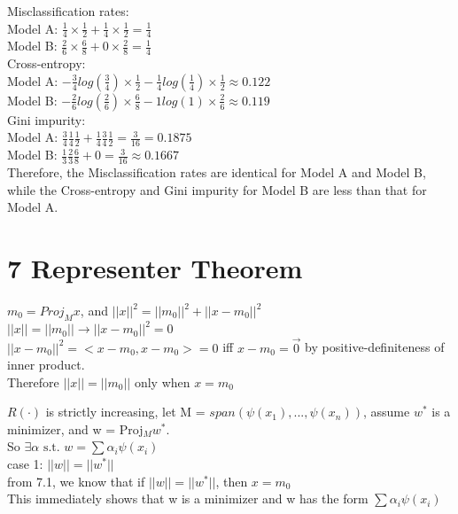 \documentclass{article}
\newenvironment{sub}[2][$-$]{\begin{trivlist}
		\item[\hskip \labelsep {\bfseries #1}\hskip \labelsep {\bfseries #2.}]}  {\end{trivlist}}
\begin{document}
Misclassification rates:\\
Model A: $\frac{1}{4} \times \frac{1}{2} +\frac{1}{4} \times \frac{1}{2} = \frac{1}{4}$\\
Model B: $\frac{2}{6} \times \frac{6}{8} +0 \times \frac{2}{8} = \frac{1}{4}$\\

Cross-entropy: \\
Model A: $-\frac{3}{4}log(\frac{3}{4})\times \frac{1}{2} - \frac{1}{4}log(\frac{1}{4})\times \frac{1}{2} \approx 0.122 $\\
Model B: $-\frac{2}{6}log(\frac{2}{6})\times \frac{6}{8} - 1log(1)\times \frac{2}{6}\approx 0.119 $\\

Gini impurity:\\
Model A: $\frac{3}{4}\frac{1}{4}\frac{1}{2} + \frac{1}{4}\frac{3}{4}\frac{1}{2} =  \frac{3}{16} = 0.1875$\\
Model B: $\frac{1}{3}\frac{2}{3}\frac{6}{8} + 0 =  \frac{3}{16} \approx 0.1667$\\

Therefore, the Misclassification rates are identical for Model A and Model B, while the Cross-entropy and Gini impurity for Model B are less than that for Model A.

\section{7 Representer Theorem}
\begin{sub}{7.1}
\end{sub}
$m_0 = Proj_Mx$, and $||x||^2 = ||m_0||^2 + ||x - m_0||^2$\\
$||x|| = ||m_0|| \rightarrow ||x - m_0||^2 = 0$\\
$||x - m_0||^2 = <x - m_0,x - m_0>= 0$ iff $x-m_0 =\vec{0}$ by positive-definiteness of inner product. \\
Therefore $||x|| = ||m_0||$ only when $x=m_0 $

\begin{sub}{7.2}
\end{sub}
$R(\cdot)$ is strictly increasing, let M = $span(\psi(x_1),...,\psi(x_n) )$, assume $w^*$ is a minimizer, and w = Proj$_Mw^*$.\\ So $\exists \alpha \text{ s.t. } w = \sum\alpha_i\psi(x_i)  $\\

case 1: $||w|| = ||w^*||$\\
from 7.1, we know that if  $||w|| = ||w^*||$, then $x = m_0$\\
This immediately shows that w is a minimizer and w has the form $\sum\alpha_i\psi(x_i)  $\\
\end{document}
